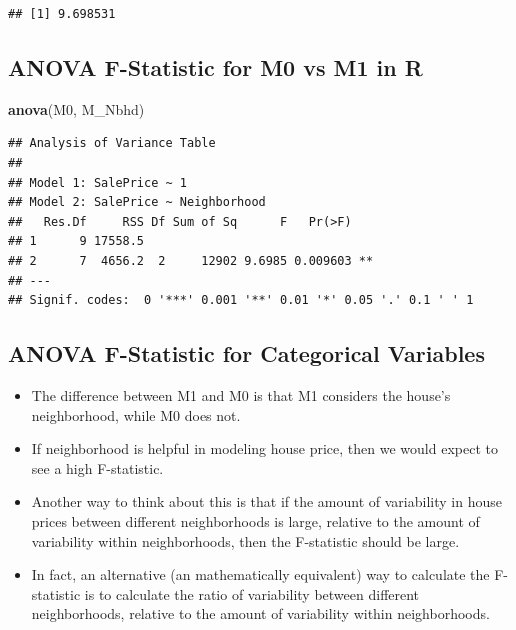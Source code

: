 \documentclass[]{book}
\newenvironment{Shaded}{\begin{snugshade}}{\end{snugshade}}
\newcommand{\KeywordTok}[1]{\textcolor[rgb]{0.13,0.29,0.53}{\textbf{#1}}}
\newcommand{\NormalTok}[1]{#1}
\providecommand{\tightlist}{%
  \setlength{\itemsep}{0pt}\setlength{\parskip}{0pt}}
\begin{document}
\begin{verbatim}
## [1] 9.698531
\end{verbatim}

\subsection{ANOVA F-Statistic for M0 vs M1 in
R}\label{anova-f-statistic-for-m0-vs-m1-in-r}

\begin{Shaded}
\begin{Highlighting}[]
\KeywordTok{anova}\NormalTok{(M0, M_Nbhd)}
\end{Highlighting}
\end{Shaded}

\begin{verbatim}
## Analysis of Variance Table
## 
## Model 1: SalePrice ~ 1
## Model 2: SalePrice ~ Neighborhood
##   Res.Df     RSS Df Sum of Sq      F   Pr(>F)   
## 1      9 17558.5                                
## 2      7  4656.2  2     12902 9.6985 0.009603 **
## ---
## Signif. codes:  0 '***' 0.001 '**' 0.01 '*' 0.05 '.' 0.1 ' ' 1
\end{verbatim}

\subsection{ANOVA F-Statistic for Categorical
Variables}\label{anova-f-statistic-for-categorical-variables}

\begin{itemize}
\tightlist
\item
  The difference between M1 and M0 is that M1 considers the house's
  neighborhood, while M0 does not.\\
\item
  If neighborhood is helpful in modeling house price, then we would
  expect to see a high F-statistic.\\
\item
  Another way to think about this is that if the amount of variability
  in house prices between different neighborhoods is large, relative to
  the amount of variability within neighborhoods, then the F-statistic
  should be large.\\
\item
  In fact, an alternative (an mathematically equivalent) way to
  calculate the F-statistic is to calculate the ratio of variability
  between different neighborhoods, relative to the amount of variability
  within neighborhoods.
\end{itemize}
\end{document}
